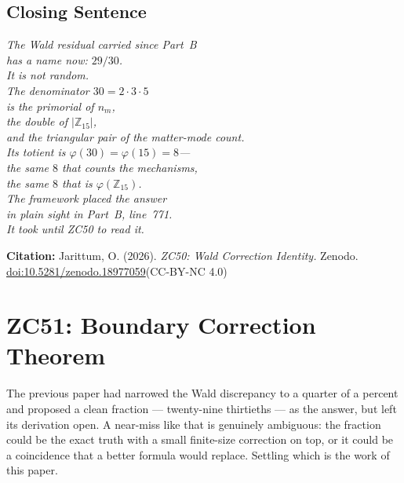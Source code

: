 \documentclass[12pt, a4paper]{article}
\begin{document}
\subsection{Closing Sentence}

\begin{center}
\textit{%
The Wald residual carried since Part~B\\
has a name now: $29/30$.\\[0.3em]
It is not random.\\
The denominator $30 = 2\cdot 3\cdot 5$\\
is the primorial of $n_m$,\\
the double of $|\mathbb{Z}_{15}|$,\\
and the triangular pair of the matter-mode count.\\[0.3em]
Its totient is $\varphi(30) = \varphi(15) = 8$---\\
the same $8$ that counts the mechanisms,\\
the same $8$ that is $\varphi(\mathbb{Z}_{15})$.\\[0.3em]
The framework placed the answer\\
in plain sight in Part~B, line~771.\\
It took until ZC50 to read it.}
\end{center}

\bigskip
\begin{center}
\textbf{Citation:} Jarittum, O. (2026).
\textit{ZC50: Wald Correction Identity.}
Zenodo.
\href{https://doi.org/10.5281/zenodo.18977059}%
{doi:10.5281/zenodo.18977059}\quad (CC-BY-NC 4.0)
\end{center}


\section{ZC51: Boundary Correction Theorem}

The previous paper had narrowed the Wald discrepancy to a quarter of a percent
and proposed a clean fraction --- twenty-nine thirtieths --- as the answer, but
left its derivation open. A near-miss like that is genuinely ambiguous: the
fraction could be the exact truth with a small finite-size correction on top, or
it could be a coincidence that a better formula would replace. Settling which is
the work of this paper.
\end{document}
